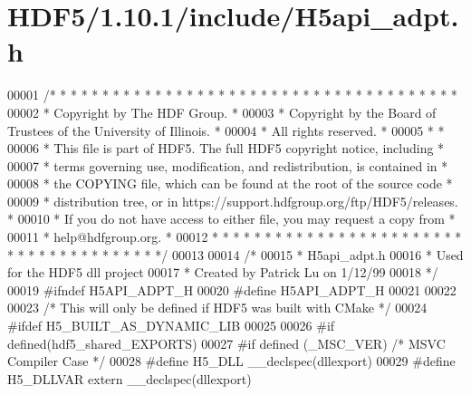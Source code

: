 \hypertarget{_h_d_f5_21_810_81_2include_2_h5api__adpt_8h_source}{}\section{H\+D\+F5/1.10.1/include/\+H5api\+\_\+adpt.h}
\label{_h_d_f5_21_810_81_2include_2_h5api__adpt_8h_source}

\begin{DoxyCode}
00001 \textcolor{comment}{/* * * * * * * * * * * * * * * * * * * * * * * * * * * * * * * * * * * * * * *}
00002 \textcolor{comment}{ * Copyright by The HDF Group.                                               *}
00003 \textcolor{comment}{ * Copyright by the Board of Trustees of the University of Illinois.         *}
00004 \textcolor{comment}{ * All rights reserved.                                                      *}
00005 \textcolor{comment}{ *                                                                           *}
00006 \textcolor{comment}{ * This file is part of HDF5.  The full HDF5 copyright notice, including     *}
00007 \textcolor{comment}{ * terms governing use, modification, and redistribution, is contained in    *}
00008 \textcolor{comment}{ * the COPYING file, which can be found at the root of the source code       *}
00009 \textcolor{comment}{ * distribution tree, or in https://support.hdfgroup.org/ftp/HDF5/releases.  *}
00010 \textcolor{comment}{ * If you do not have access to either file, you may request a copy from     *}
00011 \textcolor{comment}{ * help@hdfgroup.org.                                                        *}
00012 \textcolor{comment}{ * * * * * * * * * * * * * * * * * * * * * * * * * * * * * * * * * * * * * * */}
00013 
00014 \textcolor{comment}{/*}
00015 \textcolor{comment}{ * H5api\_adpt.h}
00016 \textcolor{comment}{ * Used for the HDF5 dll project}
00017 \textcolor{comment}{ * Created by Patrick Lu on 1/12/99}
00018 \textcolor{comment}{ */}
00019 \textcolor{preprocessor}{#ifndef H5API\_ADPT\_H}
00020 \textcolor{preprocessor}{#define H5API\_ADPT\_H}
00021 
00022 
00023 \textcolor{comment}{/* This will only be defined if HDF5 was built with CMake */}
00024 \textcolor{preprocessor}{#ifdef H5\_BUILT\_AS\_DYNAMIC\_LIB}
00025 
00026 \textcolor{preprocessor}{#if defined(hdf5\_shared\_EXPORTS)}
00027 \textcolor{preprocessor}{  #if defined (\_MSC\_VER)  }\textcolor{comment}{/* MSVC Compiler Case */}\textcolor{preprocessor}{}
00028 \textcolor{preprocessor}{    #define H5\_DLL \_\_declspec(dllexport)}
00029 \textcolor{preprocessor}{    #define H5\_DLLVAR extern \_\_declspec(dllexport)}

\end{DoxyCode}

